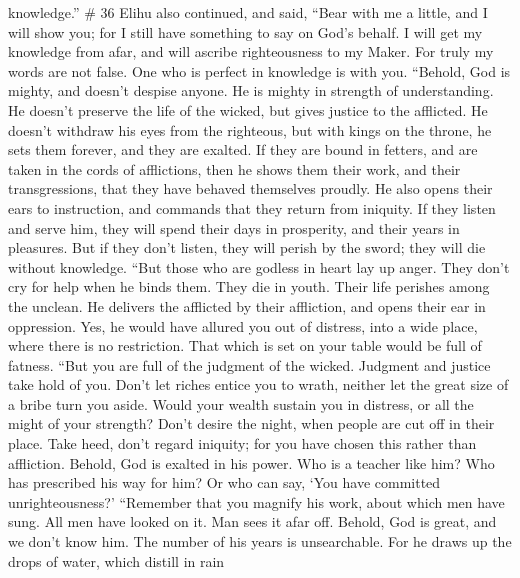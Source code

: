 knowledge.'' \# 36  Elihu also continued, and said,
 ``Bear with me a little, and I will show you; for I still
have something to say on God's behalf.  I will get my
knowledge from afar, and will ascribe righteousness to my Maker.
 For truly my words are not false. One who is perfect in
knowledge is with you.  ``Behold, God is mighty, and doesn't
despise anyone. He is mighty in strength of understanding. 
He doesn't preserve the life of the wicked, but gives justice to the
afflicted.  He doesn't withdraw his eyes from the righteous,
but with kings on the throne, he sets them forever, and they are
exalted.  If they are bound in fetters, and are taken in the
cords of afflictions,  then he shows them their work, and
their transgressions, that they have behaved themselves proudly.
 He also opens their ears to instruction, and commands that
they return from iniquity.  If they listen and serve him,
they will spend their days in prosperity, and their years in pleasures.
 But if they don't listen, they will perish by the sword;
they will die without knowledge.  ``But those who are
godless in heart lay up anger. They don't cry for help when he binds
them.  They die in youth. Their life perishes among the
unclean.  He delivers the afflicted by their affliction,
and opens their ear in oppression.  Yes, he would have
allured you out of distress, into a wide place, where there is no
restriction. That which is set on your table would be full of fatness.
 ``But you are full of the judgment of the wicked. Judgment
and justice take hold of you.  Don't let riches entice you
to wrath, neither let the great size of a bribe turn you aside.
 Would your wealth sustain you in distress, or all the
might of your strength?  Don't desire the night, when
people are cut off in their place.  Take heed, don't regard
iniquity; for you have chosen this rather than affliction. 
Behold, God is exalted in his power. Who is a teacher like him?
 Who has prescribed his way for him? Or who can say, `You
have committed unrighteousness?'  ``Remember that you
magnify his work, about which men have sung.  All men have
looked on it. Man sees it afar off.  Behold, God is great,
and we don't know him. The number of his years is unsearchable.
 For he draws up the drops of water, which distill in rain

